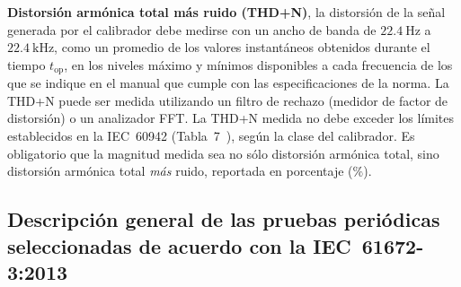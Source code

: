 \textbf{Distorsión armónica total más ruido (THD+N)}, la distorsión de la señal generada por el calibrador debe medirse con un ancho de banda de $\qty{22.4}{\Hz}$ a $\qty{22.4}{\kHz}$, como un promedio de los valores instantáneos obtenidos durante el tiempo $t_{\mathrm{op}}$, en los niveles máximo y mínimos disponibles a cada frecuencia de los que se indique en el manual que cumple con las especificaciones de la norma.
La THD+N puede ser medida utilizando un filtro de rechazo (medidor de factor de distorsión) o un analizador FFT. La THD+N medida no debe exceder los límites establecidos en la \mbox{IEC 60942} (\mbox{Tabla 7}~\citeyear{IEC_TC29_2017}), según la clase del calibrador.
Es obligatorio que la magnitud medida sea no sólo distorsión armónica total, sino distorsión armónica total \emph{más} ruido, reportada en porcentaje ($\%$).

\subsection{Descripción general de las pruebas periódicas seleccionadas de acuerdo con la \mbox{IEC 61672-3:2013}}
\label{subsec:slm_calibration_description}


